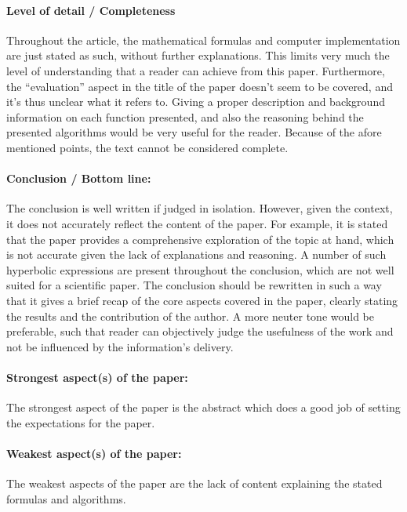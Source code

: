 \documentclass[12pt]{scrartcl}
\begin{document}


\paragraph{Level of detail / Completeness} Throughout the article, the
mathematical formulas and computer implementation are just stated as such,
without further explanations. This limits very much the level of understanding
that a reader can achieve from this paper. Furthermore, the ``evaluation''
aspect in the title of the paper doesn't seem to be covered, and it's thus
unclear what it refers to. Giving a proper description and background
information on each function presented, and also the reasoning behind the
presented algorithms would be very useful for the reader. Because of the afore
mentioned points, the text cannot be considered complete.



\paragraph{Conclusion / Bottom line:} The conclusion is well written if judged
in isolation. However, given the context, it does not accurately reflect the
content of the paper. For example, it is stated that the paper provides a
comprehensive exploration of the topic at hand, which is not accurate given the
lack of explanations and reasoning. A number of such hyperbolic expressions are
present throughout the conclusion, which are not well suited for a scientific
paper. The conclusion should be rewritten in such a way that it gives a brief
recap of the core aspects covered in the paper, clearly stating the results and
the contribution of the author. A more neuter tone would be preferable, such that
reader can objectively judge the usefulness of the work and not be influenced
by the information's delivery.


\paragraph{Strongest aspect(s) of the paper:} The strongest aspect of the paper
is the abstract which does a good job of setting the expectations for the
paper.


\paragraph{Weakest aspect(s) of the paper:} The weakest aspects of the paper are 
the lack of content explaining the stated formulas and algorithms.
\end{document}
